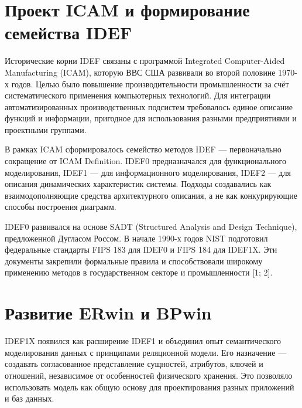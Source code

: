 \documentclass[essaypaper,paper]{pmk-graduate}
\begin{document}
\par

\section{Проект ICAM и формирование семейства IDEF}

Исторические корни IDEF связаны с программой Integrated Computer-Aided Manufacturing (ICAM), которую ВВС США развивали во второй половине 1970-х годов. Целью было повышение производительности промышленности за счёт систематического применения компьютерных технологий. Для интеграции автоматизированных производственных подсистем требовалось единое описание функций и информации, пригодное для использования разными предприятиями и проектными группами.

\par

В рамках ICAM сформировалось семейство методов IDEF — первоначально сокращение от ICAM Definition. IDEF0 предназначался для функционального моделирования, IDEF1 — для информационного моделирования, IDEF2 — для описания динамических характеристик системы. Подходы создавались как взаимодополняющие средства архитектурного описания, а не как конкурирующие способы построения диаграмм.

\par

IDEF0 развивался на основе SADT (Structured Analysis and Design Technique), предложенной Дугласом Россом. В начале 1990-х годов NIST подготовил федеральные стандарты FIPS 183 для IDEF0 и FIPS 184 для IDEF1X. Эти документы закрепили формальные правила и способствовали широкому применению методов в государственном секторе и промышленности [1; 2].

\par

\section{Развитие ERwin и BPwin}

IDEF1X появился как расширение IDEF1 и объединил опыт семантического моделирования данных с принципами реляционной модели. Его назначение — создавать согласованное представление сущностей, атрибутов, ключей и отношений, независимое от особенностей физического хранения. Это позволяло использовать модель как общую основу для проектирования разных приложений и баз данных.

\par
\end{document}
